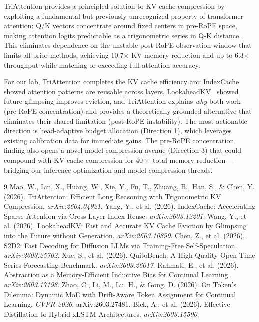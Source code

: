 \documentclass[11pt]{article}
\begin{document}
TriAttention provides a principled solution to KV cache compression by exploiting a fundamental but previously unrecognized property of transformer attention: Q/K vectors concentrate around fixed centers in pre-RoPE space, making attention logits predictable as a trigonometric series in Q-K distance. This eliminates dependence on the unstable post-RoPE observation window that limits all prior methods, achieving 10.7$\times$ KV memory reduction and up to 6.3$\times$ throughput while matching or exceeding full attention accuracy.

For our lab, TriAttention completes the KV cache efficiency arc: IndexCache~\cite{indexcache} showed attention patterns are reusable across layers, LookaheadKV~\cite{lookaheadkv} showed future-glimpsing improves eviction, and TriAttention explains \textit{why} both work (pre-RoPE concentration) and provides a theoretically grounded alternative that eliminates their shared limitation (post-RoPE instability). The most actionable direction is head-adaptive budget allocation (Direction 1), which leverages existing calibration data for immediate gains. The pre-RoPE concentration finding also opens a novel model compression avenue (Direction 3) that could compound with KV cache compression for $40\times$ total memory reduction---bridging our inference optimization and model compression threads.

\begin{thebibliography}{9}
 Mao, W., Lin, X., Huang, W., Xie, Y., Fu, T., Zhuang, B., Han, S., \& Chen, Y. (2026). TriAttention: Efficient Long Reasoning with Trigonometric KV Compression. \textit{arXiv:2604.04921}.
 Yang, Y., et al. (2026). IndexCache: Accelerating Sparse Attention via Cross-Layer Index Reuse. \textit{arXiv:2603.12201}.
 Wang, Y., et al. (2026). LookaheadKV: Fast and Accurate KV Cache Eviction by Glimpsing into the Future without Generation. \textit{arXiv:2603.10899}.
 Chen, Z., et al. (2026). S2D2: Fast Decoding for Diffusion LLMs via Training-Free Self-Speculation. \textit{arXiv:2603.25702}.
 Xue, S., et al. (2026). QuitoBench: A High-Quality Open Time Series Forecasting Benchmark. \textit{arXiv:2603.26017}.
 Rahmati, E., et al. (2026). Abstraction as a Memory-Efficient Inductive Bias for Continual Learning. \textit{arXiv:2603.17198}.
 Zhao, C., Li, M., Lu, H., \& Gong, D. (2026). On Token's Dilemma: Dynamic MoE with Drift-Aware Token Assignment for Continual Learning. \textit{CVPR 2026}. arXiv:2603.27481.
 Bick, A., et al. (2026). Effective Distillation to Hybrid xLSTM Architectures. \textit{arXiv:2603.15590}.
\end{thebibliography}
\end{document}
